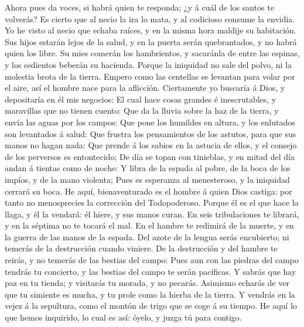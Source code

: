  Ahora pues da voces, si habrá quien te responda; ¿y á cuál
de los santos te volverás?  Es cierto que al necio la ira lo
mata, y al codicioso consume la envidia.  Yo he visto al
necio que echaba raíces, y en la misma hora maldije su habitación.
 Sus hijos estarán lejos de la salud, y en la puerta serán
quebrantados, y no habrá quien los libre.  Su mies comerán
los hambrientos, y sacaránla de entre las espinas, y los sedientos
beberán su hacienda.  Porque la iniquidad no sale del polvo,
ni la molestia brota de la tierra.  Empero como las
centellas se levantan para volar por el aire, así el hombre nace para la
aflicción.  Ciertamente yo buscaría á Dios, y depositaría en
él mis negocios:  El cual hace cosas grandes é
inescrutables, y maravillas que no tienen cuento:  Que da
la lluvia sobre la haz de la tierra, y envía las aguas por los campos:
 Que pone los humildes en altura, y los enlutados son
levantados á salud:  Que frustra los pensamientos de los
astutos, para que sus manos no hagan nada:  Que prende á
los sabios en la astucia de ellos, y el consejo de los perversos es
entontecido;  De día se topan con tinieblas, y en mitad del
día andan á tientas como de noche:  Y libra de la espada al
pobre, de la boca de los impíos, y de la mano violenta; 
Pues es esperanza al menesteroso, y la iniquidad cerrará su boca.
 He aquí, bienaventurado es el hombre á quien Dios castiga:
por tanto no menosprecies la corrección del Todopoderoso. 
Porque él es el que hace la llaga, y él la vendará: él hiere, y sus
manos curan.  En seis tribulaciones te librará, y en la
séptima no te tocará el mal.  En el hambre te redimirá de
la muerte, y en la guerra de las manos de la espada.  Del
azote de la lengua serás encubierto; ni temerás de la destrucción cuando
viniere.  De la destrucción y del hambre te reirás, y no
temerás de las bestias del campo:  Pues aun con las piedras
del campo tendrás tu concierto, y las bestias del campo te serán
pacíficas.  Y sabrás que hay paz en tu tienda; y visitarás
tu morada, y no pecarás.  Asimismo echarás de ver que tu
simiente es mucha, y tu prole como la hierba de la tierra. 
Y vendrás en la vejez á la sepultura, como el montón de trigo que se
coge á su tiempo.  He aquí lo que hemos inquirido, lo cual
es así: óyelo, y juzga tú para contigo.

